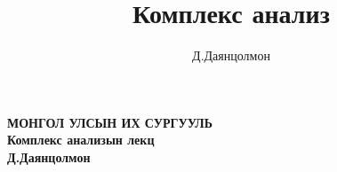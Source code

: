 \documentclass[b5paper,11pt]{book}
\title{\LARGE \bf  Комплекс анализ}
\author{Д.Даянцолмон}
\theoremstyle{plain}
\theoremstyle{remark}
\numberwithin{equation}{chapter}
\begin{document}
\frontmatter
\begin{titlepage}
\begin{center}


\textsc{\bf МОНГОЛ УЛСЫН ИХ СУРГУУЛЬ}\\[5cm]





{ \LARGE \bfseries Комплекс анализын лекц} \\[3cm]

{ \LARGE \bfseries Д.Даянцолмон}\\%
\end{center}
\end{titlepage}
\newpage
%
\tableofcontents
\mainmatter
%
%
\setcounter{chapter}{5}
%
%
%
%
%

%
%
%
%
%
\end{document}
